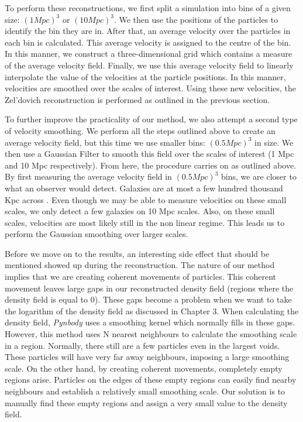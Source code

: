 To perform these reconstructions, we first split a simulation into bins of a given size: $(1 Mpc)^3$ or $(10 Mpc)^3$. We then use the positions of the particles to identify the bin they are in. After that, an average velocity over the particles in each bin is calculated. This average velocity is assigned to the centre of the bin. In this manner, we construct a three-dimensional grid which contains a measure of the average velocity field. Finally, we use this average velocity field to linearly interpolate the value of the velocities at the particle positions. In this manner, velocities are smoothed over the scales of interest. Using these new velocities, the Zel'dovich reconstruction is performed as outlined in the previous section.

To further improve the practicality of our method, we also attempt a second type of velocity smoothing. We perform all the steps outlined above to create an average velocity field, but this time we use smaller bins: $(0.5 Mpc)^3$ in size. We then use a Gaussian Filter to smooth this field over the scales of interest (1 Mpc and 10 Mpc respectively). From here, the procedure carries on as outlined above. By first measuring the average velocity field in $(0.5 Mpc)^3$ bins, we are closer to what an observer would detect. Galaxies are at most a few hundred thousand Kpc across . Even though we may be able to measure velocities on these small scales, we only detect a few galaxies on 10 Mpc scales. Also, on these small scales, velocities are most likely still in the non linear regime. This leads us to perform the Gaussian smoothing over larger scales.

Before we move on to the results, an interesting side effect that should be mentioned showed up during the reconstruction. The nature of our method implies that we are creating coherent movements of particles. This coherent movement leaves large gaps in our reconstructed density field (regions where the density field is equal to 0). These gaps become a problem when we want to take the logarithm of the density field as discussed in Chapter 3. When calculating the density field, \textit{Pynbody} uses a smoothing kernel which normally fills in these gaps. However, this method uses N nearest neighbours to calculate the smoothing scale in a region. Normally, there still are a few particles even in the largest voids. These particles will have very far away neighbours, imposing a large smoothing scale. On the other hand, by creating coherent movements, completely empty regions arise. Particles on the edges of these empty regions can easily find nearby neighbours and establish a relatively small smoothing scale. Our solution is to manually find these empty regions and assign a very small value to the density field. 


